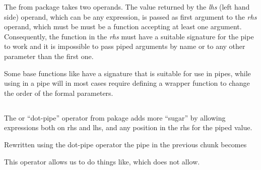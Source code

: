\documentclass[krantz2]{krantz}\usepackage{knitr}%
\begin{document}
\begin{explainbox}
The \Roperator{\%>\%} from package  takes two operands. The value returned by the \emph{lhs} (left hand side) operand, which can be any \Rlang expression, is passed as first argument to the \emph{rhs} operand, which must be must be a function accepting at least one argument. Consequently, the function in the \emph{rhs} must have a suitable signature for the pipe to work and it is impossible to pass piped arguments by name or to any other parameter than the first one.

Some base \Rlang functions like  have a signature that is suitable for use in pipes, while using  in a pipe will in most cases require defining a wrapper function to change the order of the formal parameters.
\end{explainbox}

\subsection{}

The  or ``dot-pipe'' operator from pakage  adds more ``sugar'' by allowing expressions both on rhs and lhs, and any position in the rhs for the piped value.

Rewritten using the dot-pipe operator the pipe in the previous chunk becomes
\begin{knitrout}\footnotesize
{}\color{fgcolor}
\end{knitrout}

This operator allows us to do things like, which \Roperator{\%>\%} does not allow.
\begin{knitrout}\footnotesize
{}\color{fgcolor}
\end{knitrout}
\end{document}
